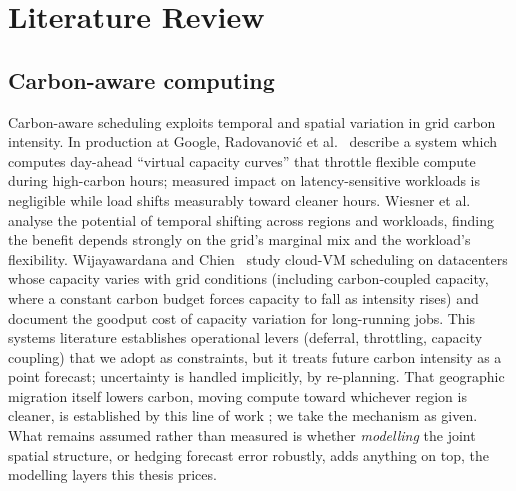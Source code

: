 \documentclass[10pt,twocolumn]{article}
\begin{document}
\section{Literature Review}\label{sec:lit}

\subsection{Carbon-aware computing}
Carbon-aware scheduling exploits temporal and spatial variation in grid carbon
intensity. In production at Google, Radovanovi\'c et
al.~\citep{radovanovic2022} describe a system which
computes day-ahead ``virtual capacity curves'' that throttle flexible compute during
high-carbon hours; measured impact on latency-sensitive workloads is negligible
while load shifts measurably toward cleaner hours. Wiesner et al.~\citep{wiesner2021} analyse the
potential of temporal shifting across regions and workloads, finding the benefit
depends strongly on the grid's marginal mix and the workload's flexibility.
Wijayawardana and Chien~\citep{wijayawardana2025} study cloud-VM scheduling on datacenters whose capacity
varies with grid conditions (including carbon-coupled capacity, where a constant
carbon budget forces capacity to fall as intensity rises) and document the
goodput cost of capacity variation for long-running jobs. This systems literature
establishes operational levers (deferral, throttling, capacity coupling) that we
adopt as constraints, but it treats future carbon intensity as a point forecast;
uncertainty is handled implicitly, by re-planning. That geographic migration itself
lowers carbon, moving compute toward whichever region is cleaner, is established by
this line of work \citep{radovanovic2022,wiesner2021}; we take the mechanism as given.
What remains assumed rather than measured is whether \emph{modelling} the joint spatial
structure, or hedging forecast error robustly, adds anything on top, the modelling
layers this thesis prices.
\end{document}
